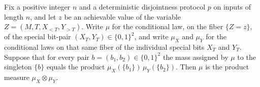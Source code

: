 \begin{theorem}
\label{CommunicationComplexity.Functions.Disjointness.RandomizedLowerBound.conditionalSpecialPairLaw_eq_prod_of_singleton_factorization}
\leanok
{}
Fix a positive integer $n$ and a deterministic disjointness protocol $p$ on inputs of
length $n$, and let $z$ be an achievable value of the variable $Z=(M,T,X_{<T},Y_{>T})$.
Write $\mu$ for the conditional law, on the fiber $\{Z=z\}$, of the special bit-pair
$(X_T,Y_T)\in\{0,1\}^2$, and write $\mu_X$ and $\mu_Y$ for the conditional laws on that
same fiber of the individual special bits $X_T$ and $Y_T$. Suppose that for every pair
$b=(b_1,b_2)\in\{0,1\}^2$ the mass assigned by $\mu$ to the singleton $\{b\}$ equals the
product $\mu_X(\{b_1\})\,\mu_Y(\{b_2\})$. Then $\mu$ is the product measure
$\mu_X\otimes\mu_Y$.
\end{theorem}


